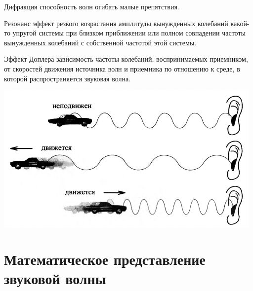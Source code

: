 \documentclass{beamer}
\begin{document}
\begin{frame}
\begin{block}{Дифракция}
способность волн огибать малые препятствия.
\end{block}
\begin{block}{Резонанс}
эффект резкого возрастания амплитуды вынужденных колебаний какой-то упругой системы при близком приближении или полном совпадении частоты вынужденных колебаний с собственной частотой этой системы.
\end{block}
\begin{block}{Эффект Доплера}
зависимость частоты колебаний, воспринимаемых приемником, от скоростей движения источника волн и приемника по отношению к среде, в которой распространяется звуковая волна.
\end{block}
\end{frame}

\begin{frame}
\begin{center}
\includegraphics[scale=0.9]{pic-dopler-01}
\end{center}
\end{frame}
  
\section{Математическое представление звуковой волны}
\end{document}
